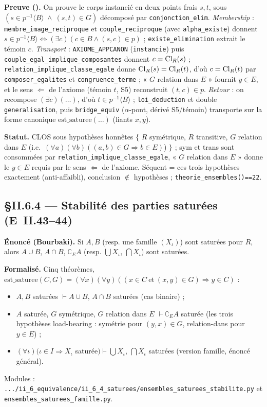 \textbf{Preuve (\Nstar).} On prouve le corps instancié en deux points frais $s, t$, sous
$(s \in p^{-1}\langle B\rangle \ \wedge\ (s,t)\in G)$ décomposé par \texttt{conjonction\_elim}.
\emph{Membership} : \texttt{membre\_image\_reciproque} et \texttt{couple\_reciproque} (avec
\texttt{alpha\_existe}) donnent $s \in p^{-1}\langle B\rangle \Leftrightarrow (\exists c)(c\in B \wedge (s,c)\in p)$ ;
\texttt{existe\_elimination} extrait le témoin $c$. \emph{Transport} : \texttt{AXIOME\_APPCANON}
(\texttt{instancie}) puis \texttt{couple\_egal\_implique\_composantes} donnent $c = \mathrm{Cl}_R(s)$ ;
\texttt{relation\_implique\_classe\_egale} donne $\mathrm{Cl}_R(s)=\mathrm{Cl}_R(t)$, d'où $c = \mathrm{Cl}_R(t)$ par
\texttt{composer\_egalites} et \texttt{congruence\_terme} ; « $G$ relation dans $E$ » fournit $y\in E$,
et le sens $\Leftarrow$ de l'axiome (témoin $t$, S5) reconstruit $(t,c)\in p$. \emph{Retour} : on
recompose $(\exists c)(\ldots)$, d'où $t \in p^{-1}\langle B\rangle$ ; \texttt{loi\_deduction} et double
\texttt{generalisation}, puis \texttt{bridge\_equiv} ($\alpha$-pont, dérivé S5/témoin) transporte sur
la forme canonique $\mathrm{est\_saturee}(\ldots)$ (liants $x, y$).

\textbf{Statut.} CLOS sous hypothèses honnêtes $\{$ $R$ symétrique, $R$ transitive, $G$ relation dans
$E$ (i.e.\ $(\forall a)(\forall b)((a,b)\in G \Rightarrow b\in E)$) $\}$ ; sym et trans sont consommées
par \texttt{relation\_implique\_classe\_egale}, « $G$ relation dans $E$ » donne le $y\in E$ requis par
le sens $\Leftarrow$ de l'axiome. Séquent = ces trois hypothèses exactement (anti-affaibli),
conclusion $\notin$ hypothèses ; \texttt{theorie\_ensembles()==22}.

\subsection{§II.6.4 --- Stabilité des parties saturées (E~II.43--44)}
\textbf{Énoncé (Bourbaki).} Si $A,B$ (resp. une famille $(X_\iota)$) sont saturées pour
$R$, alors $A\cup B$, $A\cap B$, $\complement_E A$ (resp. $\bigcup X_\iota$,
$\bigcap X_\iota$) sont saturées.

\textbf{Formalisé.} Cinq théorèmes, $\mathrm{est\_saturee}(C,G)=(\forall x)(\forall y)
((x\in C\ \text{et}\ (x,y)\in G)\Rightarrow y\in C)$ :
\begin{itemize}
  \item $A,B$ saturées $\vdash A\cup B$, $A\cap B$ saturées (cas binaire) ;
  \item $A$ saturée, $G$ symétrique, $G$ relation dans $E$ $\vdash \complement_E A$ saturée
        (les trois hypothèses load-bearing : symétrie pour $(y,x)\in G$, relation-dans pour $y\in E$) ;
  \item $(\forall\iota)(\iota\in I\Rightarrow X_\iota$ saturée$)\vdash\bigcup X_\iota$,
        $\bigcap X_\iota$ saturées (version famille, énoncé général).
\end{itemize}
Modules : \texttt{.../ii\_6\_equivalence/ii\_6\_4\_saturees/ensembles\_saturees\_stabilite.py}
et \texttt{ensembles\_saturees\_famille.py}.

